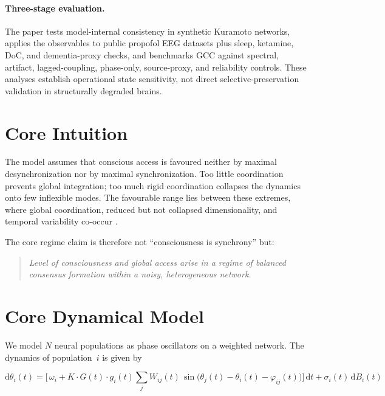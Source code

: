 \documentclass[11pt,a4paper]{article}
\theoremstyle{plain}
\theoremstyle{definition}
\theoremstyle{remark}
\begin{document}
\paragraph{Three-stage evaluation.}
The paper tests model-internal consistency in synthetic Kuramoto networks, applies the observables to public propofol EEG datasets plus sleep, ketamine, DoC, and dementia-proxy checks, and benchmarks GCC against spectral, artifact, lagged-coupling, phase-only, source-proxy, and reliability controls. These analyses establish operational state sensitivity, not direct selective-preservation validation in structurally degraded brains.


\section{Core Intuition}
\label{sec:intuition}

The model assumes that conscious access is favoured neither by maximal desynchronization nor by maximal synchronization. Too little coordination prevents global integration; too much rigid coordination collapses the dynamics onto few inflexible modes. The favourable range lies between these extremes, where global coordination, reduced but not collapsed dimensionality, and temporal variability co-occur \citep{fries2015,deco2017}.

The core regime claim is therefore not ``consciousness is synchrony'' but:

\begin{quote}
\itshape
Level of consciousness and global access arise in a regime of balanced consensus formation within a noisy, heterogeneous network.
\end{quote}


\section{Core Dynamical Model}
\label{sec:core}
\label{sec:kernmodell}

We model $N$ neural populations as phase oscillators on a weighted network. The dynamics of population~$i$ is given by

\begin{equation}
\label{eq:dynamics}
\mathrm{d}\theta_i(t)
= \biggl[\,\omega_i
+ K \cdot G(t) \cdot g_i(t) \sum_{j} W_{ij}(t)\,\sin\!\bigl(\theta_j(t) - \theta_i(t) - \varphi_{ij}(t)\bigr)
\biggr]\,\mathrm{d}t
+ \sigma_i(t)\,\mathrm{d}B_i(t)
\end{equation}
\end{document}
